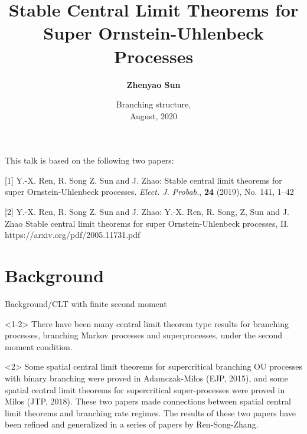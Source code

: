 \documentclass[xcolor=dvipsnames]{beamer}
\title[Stable CLT for superprocesses]{Stable Central Limit Theorems for Super Ornstein-Uhlenbeck Processes}
\author[Zhenyao Sun]{ 
	{\bf \Large Zhenyao Sun  }
}
\institute[]{Joint work with {\bf Yan-Xia Ren}, {\bf Renming Song} and {\bf Jianjie Zhao}}
\date[]{
	Branching structure,
	\\ August, 2020}
\begin{document}
\frame{\titlepage}

\begin{frame}
	\vfill This talk is based on the following two papers:
	
	\vfill [1] Y.-X. Ren, R. Song Z. Sun and J. Zhao: 
	Stable central limit theorems for super Ornstein-Uhlenbeck processes. 
	{\it Elect. J. Probab.}, \textbf{24} (2019), No. 141, 1--42
	
	\vfill [2] Y.-X. Ren, R. Song Z. Sun and J. Zhao: 
	Y.-X. Ren, R. Song, Z, Sun and J. Zhao Stable central limit theorems for super 
	Ornstein-Uhlenbeck processes, II. https://arxiv.org/pdf/2005.11731.pdf
\end{frame}

\section{Background}


\begin{frame}{Background/CLT with finite second moment}
\begin{block}{}<1-2>
There have been many {\color{Bittersweet}central limit theorem} type results for {\color{blue} branching processes}, {\color{blue} branching Markov processes} and {\color{blue} superprocesses}, under the {\color{PineGreen} second moment condition}.
\end{block}

\begin{block}{}<2>
	Some {\color{Bittersweet}spatial central limit theorems} for {\color{PineGreen}supercritical} {\color{blue}branching OU processes} with {\color{PineGreen} binary branching} were proved in Adamczak-Milos (EJP, 2015), and some {\color{Bittersweet}spatial central limit theorems} for {\color{PineGreen} supercritical} {\color{blue} super-processes} were proved in Milos (JTP, 2018). 
	These two papers made connections between {\color{Bittersweet}spatial central limit theorems} and {\color{Bittersweet}branching rate regimes}. The results of these two papers have been refined and generalized in a series of papers by Ren-Song-Zhang.
\end{block}
\end{frame}
\end{document}
